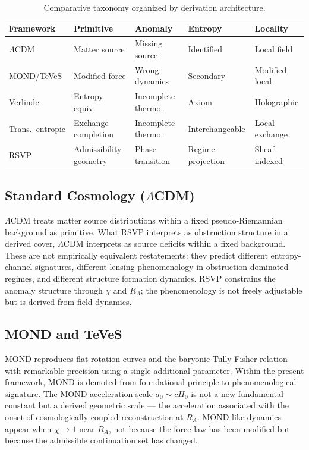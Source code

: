 \documentclass[11pt, a4paper]{article}
\theoremstyle{plain}
\theoremstyle{definition}
\theoremstyle{remark}
\newcommand{\RA}{R_{\!A}}
\begin{document}
\begin{table}[ht]
\centering
\renewcommand{\arraystretch}{1.35}
\begin{tabular}{@{}p{3.2cm}p{2.8cm}p{2.8cm}p{2.5cm}p{2.5cm}@{}}
\toprule
\textbf{Framework} & \textbf{Primitive} & \textbf{Anomaly} & \textbf{Entropy} & \textbf{Locality} \\
\midrule
$\Lambda$CDM & Matter source & Missing source & Identified & Local field \\
MOND/TeVeS & Modified force & Wrong dynamics & Secondary & Modified local \\
Verlinde & Entropy equiv.\ & Incomplete thermo.\ & Axiom & Holographic \\
Trans.\ entropic & Exchange completion & Incomplete thermo.\ & Interchangeable & Local exchange \\
RSVP & Admissibility geometry & Phase transition & Regime projection & Sheaf-indexed \\
\bottomrule
\end{tabular}
\caption{Comparative taxonomy organized by derivation architecture.}
\label{tab:comparison}
\end{table}

\subsection{Standard Cosmology ($\Lambda$CDM)}

$\Lambda$CDM treats matter source distributions within a fixed pseudo-Riemannian
background as primitive. What RSVP interprets as obstruction structure in a derived
cover, $\Lambda$CDM interprets as source deficits within a fixed background. These
are not empirically equivalent restatements: they predict different entropy-channel
signatures, different lensing phenomenology in obstruction-dominated regimes, and
different structure formation dynamics. RSVP constrains the anomaly structure through
$\chi$ and $\RA$; the phenomenology is not freely adjustable but is derived from
field dynamics.

\subsection{MOND and TeVeS}

MOND \cite{milgrom1983} reproduces flat rotation curves and the baryonic
Tully-Fisher relation \cite{mcgaugh2011} with remarkable precision using a single
additional parameter. Within the present framework, MOND is demoted from foundational
principle to phenomenological signature. The MOND acceleration scale $a_0 \sim cH_0$
is not a new fundamental constant but a derived geometric scale --- the acceleration
associated with the onset of cosmologically coupled reconstruction at $\RA$.
MOND-like dynamics appear when $\chi \to 1$ near $\RA$, not because the force law
has been modified but because the admissible continuation set has changed.
\end{document}
